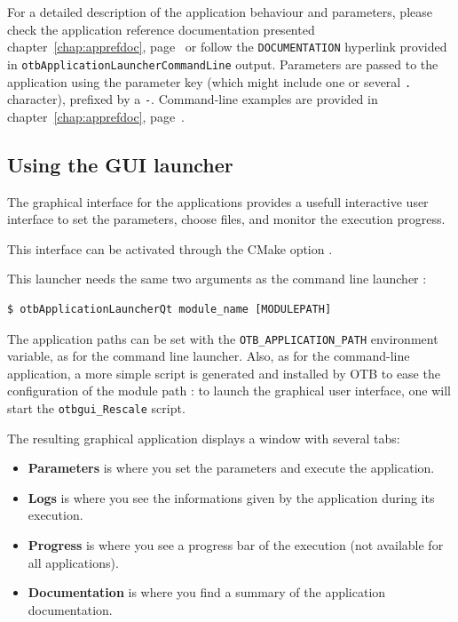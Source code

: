 For a detailed description of the application behaviour and
parameters, please check the application reference documentation presented
chapter~\ref{chap:apprefdoc}, page~\pageref{chap:apprefdoc} or
follow the \verb?DOCUMENTATION? hyperlink provided in
\verb?otbApplicationLauncherCommandLine? output. Parameters are passed
to the application using the parameter key (which might include one or
several \verb?.? character), prefixed by a \verb?-?. Command-line
examples are provided in chapter~\ref{chap:apprefdoc},
page~\pageref{chap:apprefdoc}.


\subsection{Using the GUI launcher}

The graphical interface for the applications provides a usefull interactive user interface
to set the parameters, choose files, and monitor the execution progress.

This interface can be activated through the CMake option .

This launcher needs the same two arguments as the command line launcher :
\begin{verbatim}
$ otbApplicationLauncherQt module_name [MODULEPATH]
\end{verbatim}

The application paths can be set with the \verb?OTB_APPLICATION_PATH? environment variable,
as for the command line launcher.
Also, as for the command-line application, a more simple script is generated and installed by OTB
to ease the configuration of the module path : to launch the  graphical user interface,
one will start the \verb?otbgui_Rescale? script.

The resulting graphical application displays a window with several tabs:
\begin{itemize}
\item \textbf{Parameters} is where you set the parameters and 
execute the application. 
\item \textbf{Logs} is where you see the informations given by 
the application during its execution. 
\item \textbf{Progress} is where you see a progress bar of the 
execution (not available for all applications). 
\item \textbf{Documentation} is where you find a summary of the 
application documentation.
\end{itemize}

